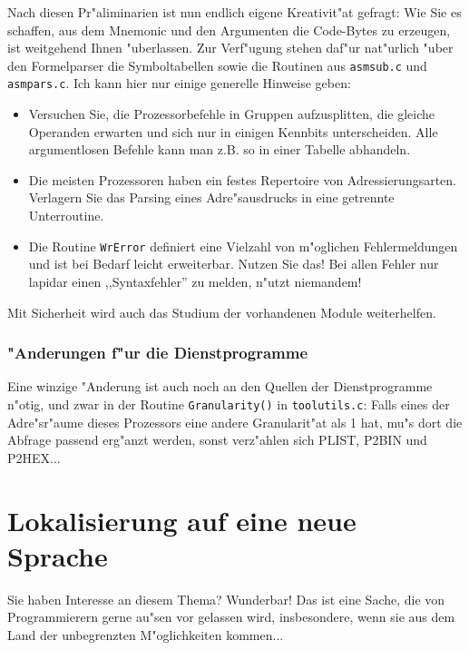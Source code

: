 \documentclass[12pt,a4paper,twoside]{report}
\newcommand{\tty}[1]{{\tt #1}}
\begin{document}
Nach diesen Pr"aliminarien ist nun endlich eigene Kreativit"at gefragt:
Wie Sie es schaffen, aus dem Mnemonic und den Argumenten die Code-Bytes zu
erzeugen, ist weitgehend Ihnen "uberlassen.  Zur Verf"ugung stehen daf"ur
nat"urlich "uber den Formelparser die Symboltabellen sowie die Routinen
aus
\tty{asmsub.c} und \tty{asmpars.c}.  Ich kann hier nur einige generelle
Hinweise geben:
\begin{itemize}
\item{Versuchen Sie, die Prozessorbefehle in Gruppen aufzusplitten, die
      gleiche Operanden erwarten und sich nur in einigen Kennbits
      unterscheiden.  Alle argumentlosen Befehle kann man z.B. so in einer
      Tabelle abhandeln.}
\item{Die meisten Prozessoren haben ein festes Repertoire von
      Adressierungsarten.  Verlagern Sie das Parsing eines Adre"sausdrucks
      in eine getrennte Unterroutine.}
\item{Die Routine \tty{WrError} definiert eine Vielzahl von m"oglichen
      Fehlermeldungen und ist bei Bedarf leicht erweiterbar.  Nutzen Sie
      das!  Bei allen Fehler nur lapidar einen ,,Syntaxfehler'' zu melden,
      n"utzt niemandem!}
\end{itemize}
Mit Sicherheit wird auch das Studium der vorhandenen Module weiterhelfen.

\subsubsection{"Anderungen f"ur die Dienstprogramme}

Eine winzige "Anderung ist auch noch an den Quellen der Dienstprogramme
n"otig, und zwar in der Routine {\tt Granularity()} in {\tt toolutils.c}:
Falls eines der Adre"sr"aume dieses Prozessors eine andere Granularit"at
als 1 hat, mu"s dort die Abfrage passend erg"anzt werden, sonst verz"ahlen
sich PLIST, P2BIN und P2HEX...


\section{Lokalisierung auf eine neue Sprache}

Sie haben Interesse an diesem Thema?  Wunderbar!  Das ist eine Sache, die
von Programmierern gerne au"sen vor gelassen wird, insbesondere, wenn sie
aus dem Land der unbegrenzten M"oglichkeiten kommen...
\end{document}
